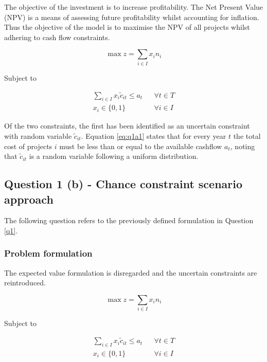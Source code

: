 \documentclass[a4paper,11pt]{article}
\begin{document}
\setcounter{equation}{0}	

The objective of the investment is to increase profitability. The Net Present Value (NPV) is a means of assessing future profitability whilst accounting for inflation. Thus the objective of the model is to maximise the NPV of all projects whilst adhering to cash flow constraints.

\begin{equation}
	\max z = \sum_{i\in I} x_i n_i
\end{equation}

Subject to

\begin{align}
\label{eq:q1a1}
	\sum_{i\in I} x_i\tilde{c}_{it} \leq a_t && \forall t\in T \\
\label{eq:q1a2}
	x_i \in \{0,1\} && \forall i\in I
\end{align}

Of the two constraints, the first has been identified as an uncertain constraint with random variable $\tilde{c}_{it}$. Equation \ref{eq:q1a1} states that for every year $t$ the total cost of projects $i$ must be less than or equal to the available cashflow $a_t$, noting that $\tilde{c}_{it}$ is a random variable following a uniform distribution.

\newpage


\subsection{Question 1 (b) - Chance constraint scenario approach}
The following question refers to the previously defined formulation in Question \ref{q1}.

\subsubsection{Problem formulation}
The expected value formulation is disregarded and the uncertain constraints are reintroduced.

\begin{equation}
	\max z = \sum_{i\in I} x_i n_i
\end{equation}

Subject to

\begin{align}
	\sum_{i\in I} x_i\tilde{c}_{it} \leq a_t && \forall t\in T \label{q1b7}		\\
	x_i \in \{0,1\} && \forall i\in I
\end{align}
\end{document}
